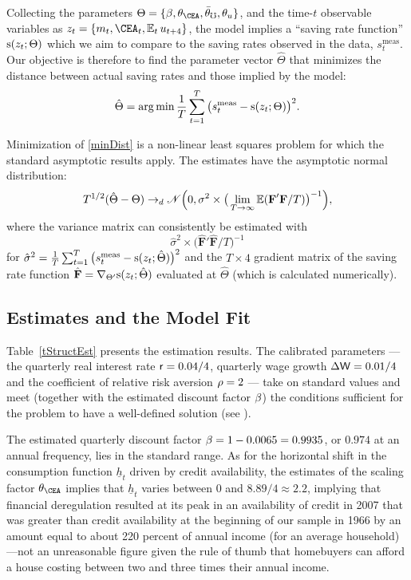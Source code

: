 \documentclass[titlepage]{\econtex}
\DeclareMathOperator*{\argmin}{arg\,min}
\begin{document}
Collecting the parameters $\Theta=\{\DiscFac,\theta_\CEA,\bar{\theta}_\mho,\theta_u\}$, and the time-$t$ observable variables as $z_{t} = \{\mRat_{t},\CEA_{t},\Ex_{t}u_{t+4}\}$, the model implies a ``saving rate function'' $\mathrm{s}(z_{t};\Theta)$ which we aim to compare to the saving rates observed in the data, $s_t^{\text{meas}}$. Our objective is therefore to find the parameter vector $\hat{\Theta}$ that minimizes the distance between actual saving rates and those implied by the model:
\begin{equation}
  \hat{\Theta}=\argmin \frac{1}{T}\sum_{t=1}^T\big(s_{t}^{\text{meas}}-\sFunc(z_{t}; \Theta)\big)^2. \label{minDist}
\end{equation}

Minimization of \eqref{minDist} is a non-linear least squares problem for which the standard asymptotic results apply. The estimates have the asymptotic normal distribution:
$$
T^{1/2}(\hat{\Theta}-\Theta)\rightarrow_d \mathscr{N}\Big(0, \sigma^2\times\big(\lim_{T\rightarrow\infty} \operatorname{\mathbb{E}} (\textbf{F}'\textbf{F}/T)\big)^{-1}\Big),
$$
where the variance matrix can consistently be estimated with
$$
\hat\sigma^2\times\big( \hat{\textbf{F}}'\hat{\textbf{F}}\big/ T \big)^{-1}
$$
for $\hat\sigma^2=\frac{1}{T}\sum_{t=1}^T\big(s_{t}^{\text{meas}}-\mathrm{s}(z_{t}; \hat{\Theta})\big)^2$ and the $T\times4$ gradient matrix of the saving rate function $\hat{\textbf{F}}=\nabla_{\Theta'}\mathrm{s}(z_{t}; \hat{\Theta})$ evaluated at $\hat{\Theta}$ (which is calculated numerically).%

\subsection{Estimates and the Model Fit}

Table~\ref{tStructEst} presents the estimation results. The calibrated parameters --- the quarterly real interest rate $\mathsf{r}=0.04/4$, quarterly wage growth $\Delta\mathsf{W}=0.01/4$ and the coefficient of relative risk aversion $\rho=2$ --- take on standard values and meet (together with the estimated discount factor $\beta$) the conditions sufficient for the problem to have a well-defined solution (see \cite{ctDiscrete}).

The estimated quarterly discount factor $\beta=1-0.0065=0.9935$, or $0.974$ at an annual frequency, lies in the standard range.  As for the horizontal shift in the consumption function $\underline{h}_t$ driven by credit availability, the estimates of the scaling factor ${\theta}_\CEA$ implies that $\underline{h}_t$ varies between $0$ and $8.89/4\approx 2.2$, implying that financial deregulation resulted at its peak in an availability of credit in 2007 that was greater than credit availability at the beginning of our sample in 1966 by an amount equal to about 220 percent of annual income (for an average household)---not an unreasonable figure given the rule of thumb that homebuyers can afford a house costing between two and three times their annual income.  %
\end{document}
